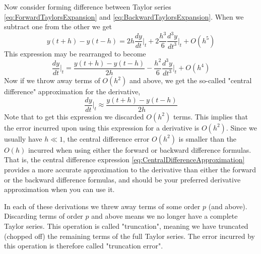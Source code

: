 \documentclass[hidelinks,notitlepage]{book}
\begin{document}
Now consider forming difference between Taylor series \cref{eq:ForwardTaylorsExpansion} and \cref{eq:BackwardTaylorsExpansion}.  When we subtract one from the other we get
\begin{equation}
\label{eq:TaylorsExpansionDifference}
\nonumber
y(t+h) - y(t-h) = 
2 h \frac{d y}{d t} \biggr\rvert_{t}
+ 2 \frac{h^3}{6} \frac{d^3 y}{d t^3} \biggr\rvert_{t}
+ O(h^5)
\end{equation}
This expression may be rearranged to become
\begin{equation}
\nonumber
\frac{d y}{d t} \biggr\rvert_{t} =
\frac{y(t+h) - y(t-h)}{2 h}  
-  \frac{h^2}{6} \frac{d^3 y}{d t^3} \biggr\rvert_{t}
+ O(h^4)
\end{equation}
Now if we throw away terms of $O(h^2)$ and above, we get the so-called "central difference" approximation for the derivative,
\begin{equation}
\label{eq:CentralDifferenceApproximation}
\frac{d y}{d t} \biggr\rvert_{t} \approx
\frac{y(t+h) - y(t-h)}{2 h}  
\end{equation}
Note that to get this expression we discarded $O(h^2)$ terms.  This implies that the error incurred upon using this expression for a derivative is $O(h^2)$.  Since we usually have $h \ll 1$, the central difference error $O(h^2)$ is smaller than the $O(h)$ incurred when using either the forward or backward difference formulas.  That is, the central difference expression \cref{eq:CentralDifferenceApproximation} provides a more accurate approximation to the derivative than either the forward or the backward difference formulas, and should be your preferred derivative approximation when you can use it.

In each of these derivations we threw away terms of some order $p$ (and above).  Discarding terms of order $p$ and above means we no longer have a complete Taylor series.  This operation is called "truncation", meaning we have truncated (chopped off) the remaining terms of the full Taylor series.  The error incurred by this operation is therefore called "truncation error".  
\end{document}
